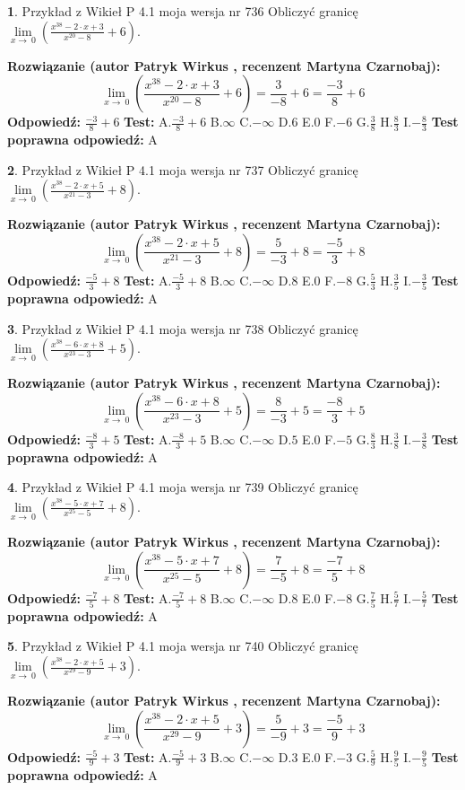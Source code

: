 \documentclass[12pt, a4paper]{article}
\theoremstyle{definition} %
\newtheorem{zad}{}
\newcommand{\zadStart}[1]{\begin{zad}#1\newline}
\newcommand{\zadStop}{\end{zad}}
\newcommand{\rozwStart}[2]{\noindent \textbf{Rozwiązanie (autor #1 , recenzent #2): }\newline}
\newcommand{\rozwStop}{\newline}
\newcommand{\odpStart}{\noindent \textbf{Odpowiedź:}\newline}
\newcommand{\odpStop}{\newline}
\newcommand{\testStart}{\noindent \textbf{Test:}\newline}
\newcommand{\testStop}{\newline}
\newcommand{\kluczStart}{\noindent \textbf{Test poprawna odpowiedź:}\newline}
\newcommand{\kluczStop}{\newline}
\begin{document}
\zadStart{Przykład z Wikieł P 4.1 moja wersja nr 736}
Obliczyć granicę $\lim\limits_{x\to\ 0}(\frac{x^{38}-2 \cdot x +3}{x^{20}-8}+6)$.
\zadStop
\rozwStart{Patryk Wirkus}{Martyna Czarnobaj}
$$\lim\limits_{x\to\ 0}(\frac{x^{38}-2 \cdot x +3}{x^{20}-8}+6)=\frac{3}{-8}+6=\frac{-3}{8}+6$$
\rozwStop
\odpStart
$\frac{-3}{8}+6$
\odpStop
\testStart
A.$\frac{-3}{8}+6$
B.$\infty$
C.$-\infty$
D.$6$
E.$0$
F.$-6$
G.$\frac{3}{8}$
H.$\frac{8}{3}$
I.$-\frac{8}{3}$
\testStop
\kluczStart
A
\kluczStop



\zadStart{Przykład z Wikieł P 4.1 moja wersja nr 737}
Obliczyć granicę $\lim\limits_{x\to\ 0}(\frac{x^{38}-2 \cdot x +5}{x^{21}-3}+8)$.
\zadStop
\rozwStart{Patryk Wirkus}{Martyna Czarnobaj}
$$\lim\limits_{x\to\ 0}(\frac{x^{38}-2 \cdot x +5}{x^{21}-3}+8)=\frac{5}{-3}+8=\frac{-5}{3}+8$$
\rozwStop
\odpStart
$\frac{-5}{3}+8$
\odpStop
\testStart
A.$\frac{-5}{3}+8$
B.$\infty$
C.$-\infty$
D.$8$
E.$0$
F.$-8$
G.$\frac{5}{3}$
H.$\frac{3}{5}$
I.$-\frac{3}{5}$
\testStop
\kluczStart
A
\kluczStop



\zadStart{Przykład z Wikieł P 4.1 moja wersja nr 738}
Obliczyć granicę $\lim\limits_{x\to\ 0}(\frac{x^{38}-6 \cdot x +8}{x^{23}-3}+5)$.
\zadStop
\rozwStart{Patryk Wirkus}{Martyna Czarnobaj}
$$\lim\limits_{x\to\ 0}(\frac{x^{38}-6 \cdot x +8}{x^{23}-3}+5)=\frac{8}{-3}+5=\frac{-8}{3}+5$$
\rozwStop
\odpStart
$\frac{-8}{3}+5$
\odpStop
\testStart
A.$\frac{-8}{3}+5$
B.$\infty$
C.$-\infty$
D.$5$
E.$0$
F.$-5$
G.$\frac{8}{3}$
H.$\frac{3}{8}$
I.$-\frac{3}{8}$
\testStop
\kluczStart
A
\kluczStop



\zadStart{Przykład z Wikieł P 4.1 moja wersja nr 739}
Obliczyć granicę $\lim\limits_{x\to\ 0}(\frac{x^{38}-5 \cdot x +7}{x^{25}-5}+8)$.
\zadStop
\rozwStart{Patryk Wirkus}{Martyna Czarnobaj}
$$\lim\limits_{x\to\ 0}(\frac{x^{38}-5 \cdot x +7}{x^{25}-5}+8)=\frac{7}{-5}+8=\frac{-7}{5}+8$$
\rozwStop
\odpStart
$\frac{-7}{5}+8$
\odpStop
\testStart
A.$\frac{-7}{5}+8$
B.$\infty$
C.$-\infty$
D.$8$
E.$0$
F.$-8$
G.$\frac{7}{5}$
H.$\frac{5}{7}$
I.$-\frac{5}{7}$
\testStop
\kluczStart
A
\kluczStop



\zadStart{Przykład z Wikieł P 4.1 moja wersja nr 740}
Obliczyć granicę $\lim\limits_{x\to\ 0}(\frac{x^{38}-2 \cdot x +5}{x^{29}-9}+3)$.
\zadStop
\rozwStart{Patryk Wirkus}{Martyna Czarnobaj}
$$\lim\limits_{x\to\ 0}(\frac{x^{38}-2 \cdot x +5}{x^{29}-9}+3)=\frac{5}{-9}+3=\frac{-5}{9}+3$$
\rozwStop
\odpStart
$\frac{-5}{9}+3$
\odpStop
\testStart
A.$\frac{-5}{9}+3$
B.$\infty$
C.$-\infty$
D.$3$
E.$0$
F.$-3$
G.$\frac{5}{9}$
H.$\frac{9}{5}$
I.$-\frac{9}{5}$
\testStop
\kluczStart
A
\kluczStop
\end{document}
